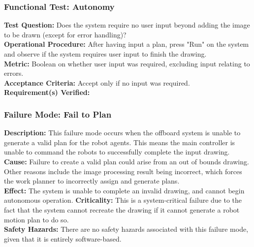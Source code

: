 \subsubsection{Functional Test: Autonomy}
\label{test:sdp_ft_autonomy}
\textbf{Test Question:} Does the system require no user input beyond adding the image to be drawn (except for error handling)? \\
\textbf{Operational Procedure:}  After having input a plan, press "Run" on the system and observe if the system requires user input to finish the drawing. \\
\textbf{Metric:} Boolean on whether user input was required, excluding input relating to errors.\\
\textbf{Acceptance Criteria:} Accept only if no input was required.\\
\textbf{Requirement(s) Verified:} 


\subsubsection{Failure Mode: Fail to Plan}
\label{sec:sdp_fm_planning}
\textbf{Description:} This failure mode occurs when the offboard system is unable to generate a valid plan for the robot agents. This means the main controller is unable to command the robots to successfully complete the input drawing.\\
\textbf{Cause:} Failure to create a valid plan could arise from an out of bounds drawing. Other reasons include the image processing result being incorrect, which forces the work planner to incorrectly assign and generate plans.\\
\textbf{Effect:} The system is unable to complete an invalid drawing, and cannot begin autonomous operation.
\textbf{Criticality:} This is a system-critical failure due to the fact that the system cannot recreate the drawing if it cannot generate a robot motion plan to do so. \\
\textbf{Safety Hazards:} There are no safety hazards associated with this failure mode, given that it is entirely software-based.
